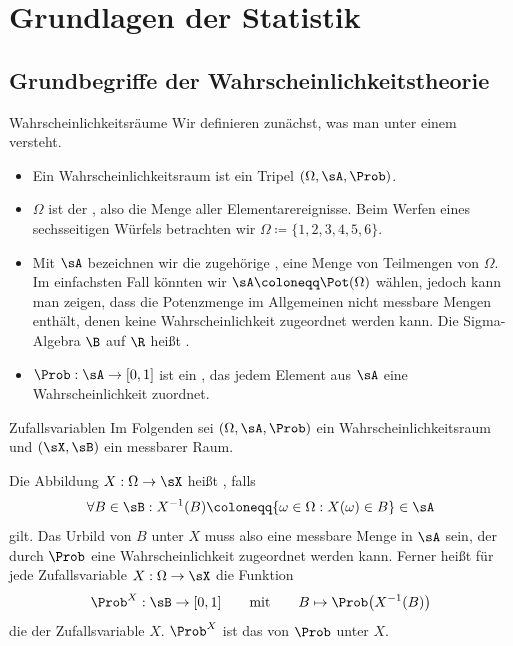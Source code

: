\section{Grundlagen der Statistik}

\divider

\subsection{Grundbegriffe der Wahrscheinlichkeitstheorie}

\begin{frame}{Wahrscheinlichkeitsräume}{}
	Wir definieren zunächst, was man unter einem  versteht.
	\begin{itemize}
		\item Ein Wahrscheinlichkeitsraum ist ein Tripel $(\Omega, \sA, \Prob)$.
		\item $\Omega$ ist der , also die Menge aller Elementarereignisse.
			Beim Werfen eines sechsseitigen Würfels betrachten wir $\Omega \coloneqq \{ 1, 2, 3, 4, 5, 6 \}$.
		\item Mit $\sA$ bezeichnen wir die zugehörige , eine Menge von Teilmengen von $\Omega$.
			Im einfachsten Fall könnten wir $\sA \coloneqq \Pot(\Omega)$ wählen, jedoch kann man zeigen,
			dass die Potenzmenge im Allgemeinen nicht messbare Mengen enthält,
			denen keine Wahrscheinlichkeit zugeordnet werden kann. Die Sigma-Algebra $\B$ auf $\R$ heißt
			.
		\item $\Prob : \sA \rightarrow [0, 1]$ ist ein ,
			das jedem Element aus $\sA$ eine Wahrscheinlichkeit zuordnet.
	\end{itemize}
\end{frame}


\begin{frame}{Zufallsvariablen}{}
	Im Folgenden sei $(\Omega, \sA, \Prob)$ ein Wahrscheinlichkeitsraum und $(\sX, \sB)$ ein messbarer Raum.
	
	\begin{mydef}
		Die Abbildung $X : \Omega \rightarrow \sX$ heißt , falls
		\begin{equation*}
			\forall B \in \sB : X^{-1}(B) \coloneqq \{ \omega \in \Omega : X(\omega) \in B \} \in \sA
		\end{equation*}
		gilt. Das Urbild von $B$ unter $X$ muss also eine messbare Menge in $\sA$ sein,
		der durch $\Prob$ eine Wahrscheinlichkeit zugeordnet werden kann.
		Ferner heißt für jede Zufallsvariable $X : \Omega \rightarrow \sX$ die Funktion
		\begin{equation*}
			\Prob^X : \sB \rightarrow [0, 1] \qquad\text{mit}\qquad B \mapsto \Prob\bigl( X^{-1}(B) \bigr)
		\end{equation*}
		die  der Zufallsvariable $X$. $\Prob^X$ ist das  von $\Prob$ unter $X$.
	\end{mydef}
\end{frame}



